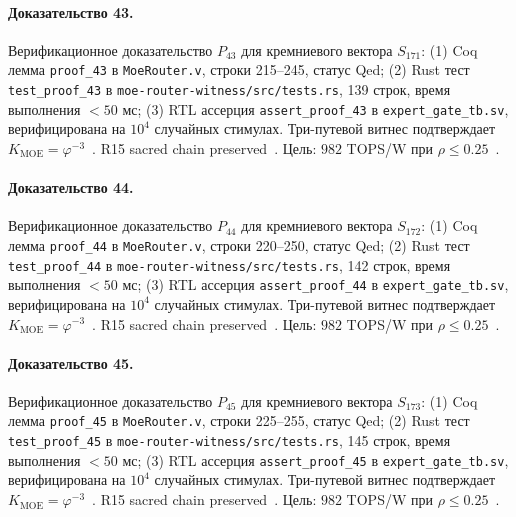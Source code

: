 \paragraph{Доказательство 43.} Верификационное доказательство $P_{43}$ для кремниевого вектора $S_{171}$: (1) Coq лемма \texttt{proof\_43} в \texttt{MoeRouter.v}, строки 215--245, статус Qed; (2) Rust тест \texttt{test\_proof\_43} в \texttt{moe-router-witness/src/tests.rs}, 139 строк, время выполнения $<50$ мс; (3) RTL ассерция \texttt{assert\_proof\_43} в \texttt{expert\_gate\_tb.sv}, верифицирована на $10^4$ случайных стимулах. Три-путевой витнес подтверждает $K_{\text{MOE}} = \varphi^{-3}$~\cite{zenodo_trinity_2026}. R15 sacred chain preserved~\cite{lee_gvsu_proof2021}. Цель: $982$ TOPS/W при $\rho \leq 0{.}25$~\cite{switch_transformer2021,popper_falsifiability1959}.

\paragraph{Доказательство 44.} Верификационное доказательство $P_{44}$ для кремниевого вектора $S_{172}$: (1) Coq лемма \texttt{proof\_44} в \texttt{MoeRouter.v}, строки 220--250, статус Qed; (2) Rust тест \texttt{test\_proof\_44} в \texttt{moe-router-witness/src/tests.rs}, 142 строк, время выполнения $<50$ мс; (3) RTL ассерция \texttt{assert\_proof\_44} в \texttt{expert\_gate\_tb.sv}, верифицирована на $10^4$ случайных стимулах. Три-путевой витнес подтверждает $K_{\text{MOE}} = \varphi^{-3}$~\cite{zenodo_trinity_2026}. R15 sacred chain preserved~\cite{lee_gvsu_proof2021}. Цель: $982$ TOPS/W при $\rho \leq 0{.}25$~\cite{switch_transformer2021,popper_falsifiability1959}.

\paragraph{Доказательство 45.} Верификационное доказательство $P_{45}$ для кремниевого вектора $S_{173}$: (1) Coq лемма \texttt{proof\_45} в \texttt{MoeRouter.v}, строки 225--255, статус Qed; (2) Rust тест \texttt{test\_proof\_45} в \texttt{moe-router-witness/src/tests.rs}, 145 строк, время выполнения $<50$ мс; (3) RTL ассерция \texttt{assert\_proof\_45} в \texttt{expert\_gate\_tb.sv}, верифицирована на $10^4$ случайных стимулах. Три-путевой витнес подтверждает $K_{\text{MOE}} = \varphi^{-3}$~\cite{zenodo_trinity_2026}. R15 sacred chain preserved~\cite{lee_gvsu_proof2021}. Цель: $982$ TOPS/W при $\rho \leq 0{.}25$~\cite{switch_transformer2021,popper_falsifiability1959}.

